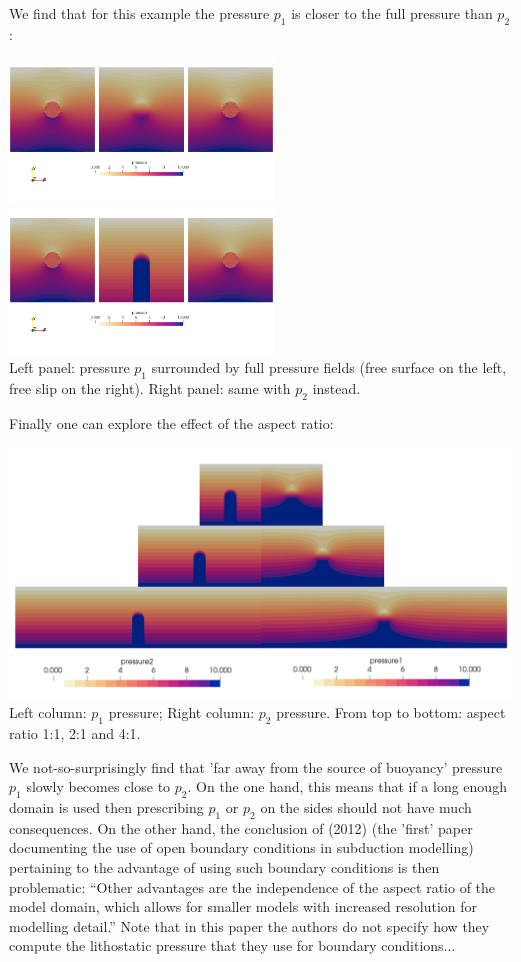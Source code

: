 We find that for this example the pressure $p_1$ is closer to the full pressure than $p_2$:
\begin{center}
\includegraphics[width=7cm]{python_codes/fieldstone_119/results/exp5/comp1}
\hspace{0.5cm}
\includegraphics[width=7cm]{python_codes/fieldstone_119/results/exp5/comp2}\\
{\captionfont Left panel: pressure $p_1$ surrounded by full pressure fields (free surface
on the left, free slip on the right). Right panel: same with $p_2$ instead.}
\end{center}

Finally one can explore the effect of the aspect ratio:
\begin{center}
\includegraphics[width=14cm]{python_codes/fieldstone_119/results/exp5/all}\\
{\captionfont Left column: $p_1$ pressure; Right column: $p_2$ pressure. From 
top to bottom: aspect ratio 1:1, 2:1 and 4:1.}
\end{center}
We not-so-surprisingly find that 'far away from the source of buoyancy' 
pressure $p_1$ slowly becomes close to $p_2$. On the one hand, this means that 
if a long enough domain is used then prescribing $p_1$ or $p_2$ on the sides should not 
have much consequences. On the other hand, the conclusion of \textcite{chgv12} (2012) 
(the 'first' paper documenting the use of open boundary conditions in subduction modelling)
pertaining to the advantage of using such boundary conditions is then problematic: 
``Other advantages are the independence of the aspect ratio of the model domain, 
which allows for smaller models with increased resolution for modelling detail.''
Note that in this paper the authors do not specify how they compute the lithostatic pressure that 
they use for boundary conditions...

